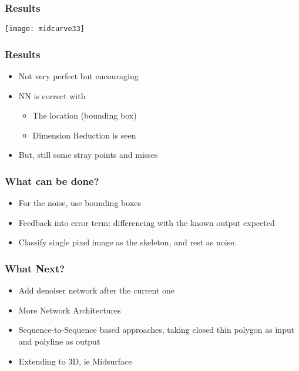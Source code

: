 \begin{frame}[fragile]\frametitle{Results}

\begin{center}
\texttt{[image: midcurve33]}
\end{center}	
\end{frame}

\begin{frame}[fragile]\frametitle{Results}
	\begin{itemize}
	\item Not very perfect but encouraging
	\item NN is correct with 
	\begin{itemize}
	\item The location (bounding box)
	\item Dimension Reduction is seen
	\end{itemize}	
	\item But, still some stray points and misses
	\end{itemize}	
\end{frame}

\begin{frame}[fragile]\frametitle{What can be done?}
	\begin{itemize}
	\item For the noise, use bounding boxes 
	\item Feedback into error term: differencing with the known output expected 
	\item Classify single pixel image as the skeleton, and rest as noise. 
	\end{itemize}	
\end{frame}

\begin{frame}[fragile]\frametitle{What Next?}
	\begin{itemize}
	\item Add denoiser network after the current one
	\item More Network Architectures
	\item Sequence-to-Sequence based approaches, taking closed thin polygon as input and polyline as output
	\item Extending to 3D, ie Midsurface
	\end{itemize}	
\end{frame}
